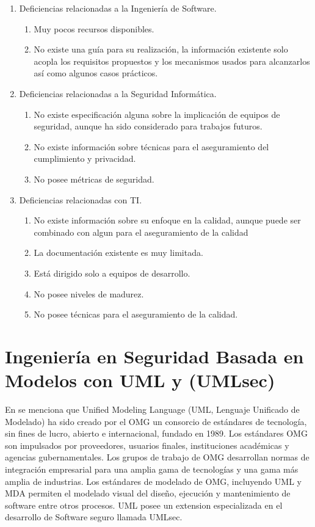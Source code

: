 \documentclass[runningheads,a4paper]{llncs}
\begin{document}
\begin{enumerate}
	\item Deficiencias relacionadas a la Ingeniería de \gls{Software}.
		\begin{enumerate}
			\item Muy pocos recursos disponibles. 
			\item No existe una guía para su realización, la información existente solo acopla los requisitos propuestos y los mecanismos usados para alcanzarlos así como algunos casos prácticos.\\
			
		\end{enumerate}
	\item Deficiencias relacionadas a la Seguridad Informática.
		\begin{enumerate}
			\item No existe especificación alguna sobre la implicación de equipos de seguridad, aunque ha sido considerado para trabajos futuros.
			\item No existe información sobre técnicas para el aseguramiento del cumplimiento y privacidad.				\item No posee métricas de seguridad.\\
						
		\end{enumerate}
	\item Deficiencias relacionadas con \gls{TI}.
		\begin{enumerate}
			\item No existe información sobre su enfoque en la calidad, aunque puede ser combinado con algun  para el aseguramiento de la calidad
			\item La documentación existente es muy limitada.
			\item Está dirigido solo a equipos de desarrollo.
			\item No posee niveles de madurez.
			\item No posee técnicas para el aseguramiento de la calidad.
		\end{enumerate}
		
\end{enumerate}


\section{Ingeniería en Seguridad Basada en Modelos con \gls{UML} y (\gls{UMLsec})}
En \cite{OMGAbout} se menciona que Unified Modeling Language (UML, Lenguaje Unificado de Modelado) ha sido creado por el \gls{OMG} un consorcio de estándares de tecnología, sin fines de lucro,  abierto e internacional, fundado en 1989. Los estándares \gls{OMG} son impulsados por proveedores, usuarios finales, instituciones académicas y agencias gubernamentales. Los grupos de trabajo de \gls{OMG} desarrollan normas de integración empresarial para una amplia gama de tecnologías y una gama más amplia de industrias. Los estándares de modelado de \gls{OMG}, incluyendo \gls{UML} y \gls{MDA} permiten el modelado visual del diseño, ejecución y mantenimiento de software entre otros procesos. \gls{UML} posee un extension especializada en el desarrollo de \gls{Software} seguro llamada \gls{UMLsec}.
\end{document}
